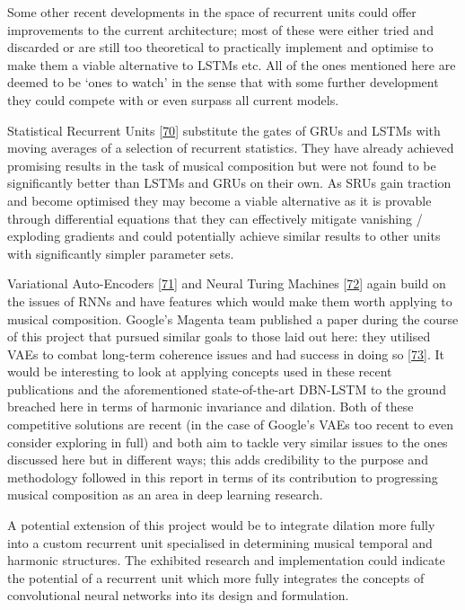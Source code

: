 \documentclass[12pt,]{article}
\begin{document}
Some other recent developments in the space of recurrent units could
offer improvements to the current architecture; most of these were
either tried and discarded or are still too theoretical to practically
implement and optimise to make them a viable alternative to LSTMs etc.
All of the ones mentioned here are deemed to be `ones to watch' in the
sense that with some further development they could compete with or even
surpass all current models.

Statistical Recurrent Units
{[}\protect\hyperlink{ref-oliva2017statistical}{70}{]} substitute the
gates of GRUs and LSTMs with moving averages of a selection of recurrent
statistics. They have already achieved promising results in the task of
musical composition but were not found to be significantly better than
LSTMs and GRUs on their own. As SRUs gain traction and become optimised
they may become a viable alternative as it is provable through
differential equations that they can effectively mitigate vanishing /
exploding gradients and could potentially achieve similar results to
other units with significantly simpler parameter sets.

Variational Auto-Encoders
{[}\protect\hyperlink{ref-roberts2017hierarchical}{71}{]} and Neural
Turing Machines {[}\protect\hyperlink{ref-graves2014neural}{72}{]} again
build on the issues of RNNs and have features which would make them
worth applying to musical composition. Google's Magenta team published a
paper during the course of this project that pursued similar goals to
those laid out here: they utilised VAEs to combat long-term coherence
issues and had success in doing so
{[}\protect\hyperlink{ref-roberts2018hierarchical}{73}{]}. It would be
interesting to look at applying concepts used in these recent
publications and the aforementioned state-of-the-art DBN-LSTM to the
ground breached here in terms of harmonic invariance and dilation. Both
of these competitive solutions are recent (in the case of Google's VAEs
too recent to even consider exploring in full) and both aim to tackle
very similar issues to the ones discussed here but in different ways;
this adds credibility to the purpose and methodology followed in this
report in terms of its contribution to progressing musical composition
as an area in deep learning research.

A potential extension of this project would be to integrate dilation
more fully into a custom recurrent unit specialised in determining
musical temporal and harmonic structures. The exhibited research and
implementation could indicate the potential of a recurrent unit which
more fully integrates the concepts of convolutional neural networks into
its design and formulation.
\end{document}
